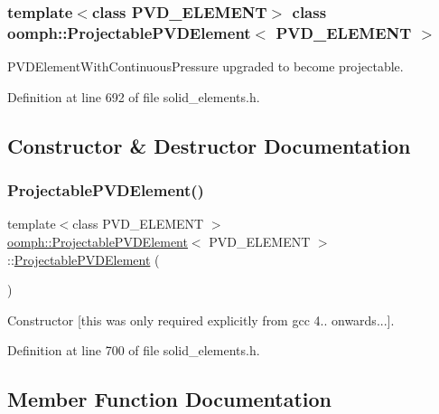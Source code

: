 \subsubsection*{template$<$class P\+V\+D\+\_\+\+E\+L\+E\+M\+E\+NT$>$\newline
class oomph\+::\+Projectable\+P\+V\+D\+Element$<$ P\+V\+D\+\_\+\+E\+L\+E\+M\+E\+N\+T $>$}

P\+V\+D\+Element\+With\+Continuous\+Pressure upgraded to become projectable. 

Definition at line 692 of file solid\+\_\+elements.\+h.



\subsection{Constructor \& Destructor Documentation}
\mbox{\label{classoomph_1_1ProjectablePVDElement_aa34288da3b895e1900bd3d1dd509ae39}} 
\subsubsection{\texorpdfstring{Projectable\+P\+V\+D\+Element()}{ProjectablePVDElement()}}
{\footnotesize\ttfamily template$<$class P\+V\+D\+\_\+\+E\+L\+E\+M\+E\+NT $>$ \\
\hyperlink{classoomph_1_1ProjectablePVDElement}{oomph\+::\+Projectable\+P\+V\+D\+Element}$<$ P\+V\+D\+\_\+\+E\+L\+E\+M\+E\+NT $>$\+::\hyperlink{classoomph_1_1ProjectablePVDElement}{Projectable\+P\+V\+D\+Element} (\begin{DoxyParamCaption}{ }\end{DoxyParamCaption})\hspace{0.3cm}{\ttfamily [inline]}}



Constructor \mbox{[}this was only required explicitly from gcc 4.. onwards...\mbox{]}. 



Definition at line 700 of file solid\+\_\+elements.\+h.



\subsection{Member Function Documentation}
\mbox{\label{classoomph_1_1ProjectablePVDElement_ab786e3176fd618064e5cb35557dc01fe}} 
